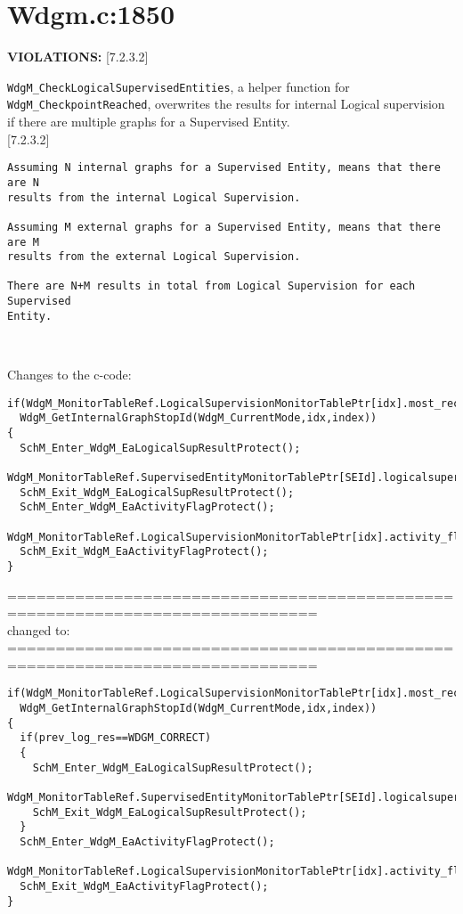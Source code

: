\documentclass[11pt,a4paper]{article}
\begin{document}
\newpage

\section{Wdgm.c:1850}
\textbf{VIOLATIONS:} [7.2.3.2]\\[0.5cm]

\lstset{language=autosar}

\lstinline!WdgM_CheckLogicalSupervisedEntities!, a helper function for
\lstinline!WdgM_CheckpointReached!, overwrites the results for internal Logical
supervision if there are multiple graphs for a Supervised Entity.\\

[7.2.3.2]
\begin{lstlisting}
Assuming N internal graphs for a Supervised Entity, means that there are N
results from the internal Logical Supervision.

Assuming M external graphs for a Supervised Entity, means that there are M
results from the external Logical Supervision.

There are N+M results in total from Logical Supervision for each Supervised
Entity.
\end{lstlisting}~\\

\lstset{language=c}

Changes to the c-code:
\begin{lstlisting}
if(WdgM_MonitorTableRef.LogicalSupervisionMonitorTablePtr[idx].most_recently_reported==
  WdgM_GetInternalGraphStopId(WdgM_CurrentMode,idx,index))
{
  SchM_Enter_WdgM_EaLogicalSupResultProtect();
  WdgM_MonitorTableRef.SupervisedEntityMonitorTablePtr[SEId].logicalsupervision_result=WDGM_CORRECT;
  SchM_Exit_WdgM_EaLogicalSupResultProtect();
  SchM_Enter_WdgM_EaActivityFlagProtect();
  WdgM_MonitorTableRef.LogicalSupervisionMonitorTablePtr[idx].activity_flag=FALSE;
  SchM_Exit_WdgM_EaActivityFlagProtect();
}
\end{lstlisting}
==============================================================================\\
changed to:\\
==============================================================================
\begin{lstlisting}
if(WdgM_MonitorTableRef.LogicalSupervisionMonitorTablePtr[idx].most_recently_reported==
  WdgM_GetInternalGraphStopId(WdgM_CurrentMode,idx,index))
{
  if(prev_log_res==WDGM_CORRECT)
  {
    SchM_Enter_WdgM_EaLogicalSupResultProtect();
    WdgM_MonitorTableRef.SupervisedEntityMonitorTablePtr[SEId].logicalsupervision_result=WDGM_CORRECT;
    SchM_Exit_WdgM_EaLogicalSupResultProtect();
  }
  SchM_Enter_WdgM_EaActivityFlagProtect();
  WdgM_MonitorTableRef.LogicalSupervisionMonitorTablePtr[idx].activity_flag=FALSE;
  SchM_Exit_WdgM_EaActivityFlagProtect();
}
\end{lstlisting}
\newpage
\end{document}

